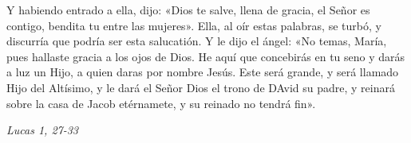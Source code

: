 \documentclass[../../devocionario.tex]{subfiles}
\begin{document}
    Y habiendo entrado a ella, dijo: «Dios te salve, llena de gracia, el Señor es contigo, bendita tu entre las mujeres». 
    Ella, al oír estas palabras, se turbó, y discurría que podría ser esta salucatión. 
    Y le dijo el ángel: «No temas, María, pues hallaste gracia a los ojos de Dios. He aquí que concebirás en tu seno y darás a luz un Hijo, 
    a quien daras por nombre Jesús. Este será grande, y será llamado Hijo del Altísimo, y le dará el Señor Dios el trono de DAvid su padre, 
    y reinará sobre la casa de Jacob etérnamete, y su reinado no tendrá fin».

    \begin{flushright}
        \textit{Lucas 1, 27-33}
    \end{flushright}
\end{document}
